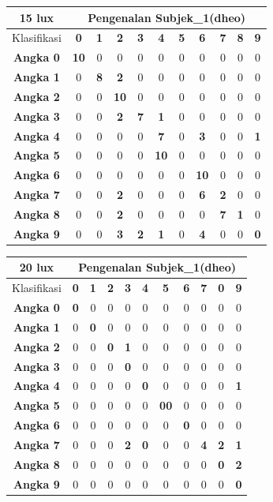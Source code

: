 \begin{tabular}{|c|c|c|c|c|c|c|c|c|c|c|}
	\hline 15 lux
	& \multicolumn{10}{|c|}{Pengenalan Subjek\_1(dheo)} \\
	\hline  Klasifikasi&\textbf{0} &\textbf{1} &\textbf{2} &\textbf{3} &\textbf{4}&\textbf{5} &\textbf{6}&\textbf{7}&\textbf{8}&\textbf{9}\\
	\hline \textbf{Angka 0} &\textbf{10} &0 &0 &0 &0 &0 &0 &0 &0 &0\\
	\hline \textbf{Angka 1} &0 &\textbf{8} &\textbf{2} &0 &0 &0 &0 &0 &0 &0\\
	\hline \textbf{Angka 2} &0 &0 &\textbf{10} &0 &0 &0 &0 &0 &0 &0\\
	\hline \textbf{Angka 3} &0 &0 &\textbf{2} &\textbf{7} &\textbf{1} &0 &0 &0 &0 &0\\
	\hline \textbf{Angka 4} &0 &0 &0 &0 &\textbf{7} &0 &\textbf{3} &0 &0 &\textbf{1}\\
	\hline \textbf{Angka 5} &0 &0 &0 &0 &\textbf{10} &0 &0 &0 &0 &0\\
	\hline \textbf{Angka 6} &0 &0 &0 &0 &0 &0 &\textbf{10} &0 &0 &0\\
	\hline \textbf{Angka 7} &0 &0 &\textbf{2} &0 &0 &0 &\textbf{6} &\textbf{2} &0 &0\\
	\hline \textbf{Angka 8} &0 &0 &\textbf{2} &0 &0 &0 &0 &\textbf{7} &\textbf{1} &0 \\
	\hline \textbf{Angka 9} &0 &0 &\textbf{3} &\textbf{2} &\textbf{1} &0 &\textbf{4} &0 &0 &\textbf{0} \\
	\hline
\end{tabular}

\begin{tabular}{|c|c|c|c|c|c|c|c|c|c|c|}
	\hline 20 lux
	& \multicolumn{10}{|c|}{Pengenalan Subjek\_1(dheo)} \\
	\hline  Klasifikasi&\textbf{0} &\textbf{1} &\textbf{2} &\textbf{3} &\textbf{4}&\textbf{5} &\textbf{6}&\textbf{7}&\textbf{0}&\textbf{9}\\
	\hline \textbf{Angka 0} &\textbf{0} &0 &0 &0 &0 &0 &0 &0 &0 &0\\
	\hline \textbf{Angka 1} &0 &\textbf{0} &0 &0 &0 &0 &0 &0 &0 &0\\
	\hline \textbf{Angka 2} &0 &0 &\textbf{0} &\textbf{1} &0 &0 &0 &0 &0 &0\\
	\hline \textbf{Angka 3} &0 &0 &0 &\textbf{0} &0 &0 &0 &0 &0 &0\\
	\hline \textbf{Angka 4} &0 &0 &0 &0 &\textbf{0} &0 &0 &0 &0 &\textbf{1}\\
	\hline \textbf{Angka 5} &0 &0 &0 &0 &0 &\textbf{00} &0 &0 &0 &0\\
	\hline \textbf{Angka 6} &0 &0 &0 &0 &0 &0 &\textbf{0} &0 &0 &0\\
	\hline \textbf{Angka 7} &0 &0 &0 &\textbf{2} &\textbf{0} &0 &0 &\textbf{4} &\textbf{2} &\textbf{1}\\
	\hline \textbf{Angka 8} &0 &0 &0 &0 &0 &0 &0 &0 &\textbf{0} &\textbf{2} \\
	\hline \textbf{Angka 9} &0 &0 &0 &0 &0 &0 &0 &0 &0 &\textbf{0} \\
	\hline
\end{tabular}

